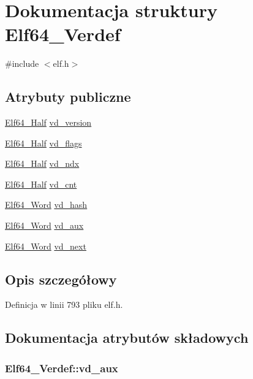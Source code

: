 \hypertarget{struct_elf64___verdef}{\section{Dokumentacja struktury Elf64\-\_\-\-Verdef}
\label{struct_elf64___verdef}
}


{\ttfamily \#include $<$elf.\-h$>$}

\subsection*{Atrybuty publiczne}
\begin{DoxyCompactItemize}
\item 
\hyperlink{elf_8h_adb6a5584018b431da3472e7c6a7fd731}{Elf64\-\_\-\-Half} \hyperlink{struct_elf64___verdef_afe15c8d72df394443deb40da61df3459}{vd\-\_\-version}
\item 
\hyperlink{elf_8h_adb6a5584018b431da3472e7c6a7fd731}{Elf64\-\_\-\-Half} \hyperlink{struct_elf64___verdef_a1d69114c03f683d4b6b6f3a83c7021f1}{vd\-\_\-flags}
\item 
\hyperlink{elf_8h_adb6a5584018b431da3472e7c6a7fd731}{Elf64\-\_\-\-Half} \hyperlink{struct_elf64___verdef_a069835dc20ac41af0ac611eefbe5169a}{vd\-\_\-ndx}
\item 
\hyperlink{elf_8h_adb6a5584018b431da3472e7c6a7fd731}{Elf64\-\_\-\-Half} \hyperlink{struct_elf64___verdef_ac41468980738fcc6b1b15ccda97a19a8}{vd\-\_\-cnt}
\item 
\hyperlink{elf_8h_aa3aa1920ed115b7ef7e99716fece4401}{Elf64\-\_\-\-Word} \hyperlink{struct_elf64___verdef_afb01f82af6211a4a0dfc314c3b3a43b2}{vd\-\_\-hash}
\item 
\hyperlink{elf_8h_aa3aa1920ed115b7ef7e99716fece4401}{Elf64\-\_\-\-Word} \hyperlink{struct_elf64___verdef_ae59893f742edf4e58e2acd78a1168aa3}{vd\-\_\-aux}
\item 
\hyperlink{elf_8h_aa3aa1920ed115b7ef7e99716fece4401}{Elf64\-\_\-\-Word} \hyperlink{struct_elf64___verdef_a9cebd5131a542990d3130489a3b4acec}{vd\-\_\-next}
\end{DoxyCompactItemize}


\subsection{Opis szczegółowy}


Definicja w linii 793 pliku elf.\-h.



\subsection{Dokumentacja atrybutów składowych}
\hypertarget{struct_elf64___verdef_ae59893f742edf4e58e2acd78a1168aa3}{
\subsubsection[{vd\-\_\-aux}]{ Elf64\-\_\-\-Verdef\-::vd\-\_\-aux}}\label{struct_elf64___verdef_ae59893f742edf4e58e2acd78a1168aa3}


